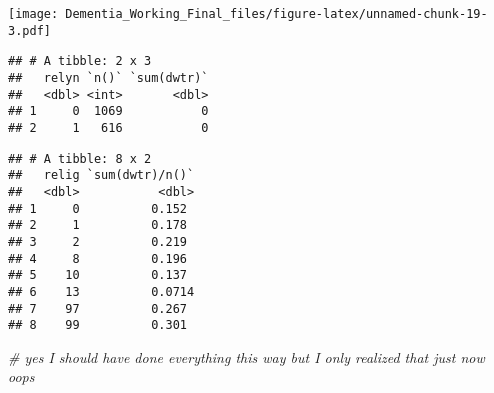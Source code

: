 \documentclass[]{article}
\newenvironment{Shaded}{\begin{snugshade}}{\end{snugshade}}
\newcommand{\CommentTok}[1]{\textcolor[rgb]{0.56,0.35,0.01}{\textit{#1}}}
\newcommand{\DataTypeTok}[1]{\textcolor[rgb]{0.13,0.29,0.53}{#1}}
\newcommand{\DecValTok}[1]{\textcolor[rgb]{0.00,0.00,0.81}{#1}}
\newcommand{\KeywordTok}[1]{\textcolor[rgb]{0.13,0.29,0.53}{\textbf{#1}}}
\newcommand{\NormalTok}[1]{#1}
\newcommand{\OperatorTok}[1]{\textcolor[rgb]{0.81,0.36,0.00}{\textbf{#1}}}
\newcommand{\StringTok}[1]{\textcolor[rgb]{0.31,0.60,0.02}{#1}}
\begin{document}
\texttt{[image: Dementia\_Working\_Final\_files/figure-latex/unnamed-chunk-19-3.pdf]}

\begin{Shaded}
\end{Shaded}

\begin{verbatim}
## # A tibble: 2 x 3
##   relyn `n()` `sum(dwtr)`
##   <dbl> <int>       <dbl>
## 1     0  1069           0
## 2     1   616           0
\end{verbatim}

\begin{Shaded}
\end{Shaded}

\begin{verbatim}
## # A tibble: 8 x 2
##   relig `sum(dwtr)/n()`
##   <dbl>           <dbl>
## 1     0          0.152 
## 2     1          0.178 
## 3     2          0.219 
## 4     8          0.196 
## 5    10          0.137 
## 6    13          0.0714
## 7    97          0.267 
## 8    99          0.301
\end{verbatim}

\begin{Shaded}
\begin{Highlighting}[]
\CommentTok{# yes I should have done everything this way but I only realized that just now oops}
\end{Highlighting}
\end{Shaded}
\end{document}
